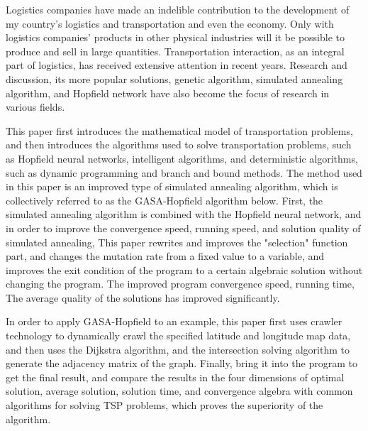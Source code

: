 \begin{eabstract}
    Logistics companies have made an indelible contribution to the development of my country’s logistics and transportation and even the economy. Only with logistics companies’ products in other physical industries will it be possible to produce and sell in large quantities. Transportation interaction, as an integral part of logistics, has received extensive attention in recent years. Research and discussion, its more popular solutions, genetic algorithm, simulated annealing algorithm, and Hopfield network have also become the focus of research in various fields.
    \par
    This paper first introduces the mathematical model of transportation problems, and then introduces the algorithms used to solve transportation problems, such as Hopfield neural networks, intelligent algorithms, and deterministic algorithms, such as dynamic programming and branch and bound methods. The method used in this paper is an improved type of simulated annealing algorithm, which is collectively referred to as the GASA-Hopfield algorithm below. First, the simulated annealing algorithm is combined with the Hopfield neural network, and in order to improve the convergence speed, running speed, and solution quality of simulated annealing, This paper rewrites and improves the "selection" function part, and changes the mutation rate from a fixed value to a variable, and improves the exit condition of the program to a certain algebraic solution without changing the program. The improved program convergence speed, running time, The average quality of the solutions has improved significantly.
    \par
    In order to apply GASA-Hopfield to an example, this paper first uses crawler technology to dynamically crawl the specified latitude and longitude map data, and then uses the Dijkstra algorithm, and the intersection solving algorithm to generate the adjacency matrix of the graph. Finally, bring it into the program to get the final result, and compare the results in the four dimensions of optimal solution, average solution, solution time, and convergence algebra with common algorithms for solving TSP problems, which proves the superiority of the algorithm. 
\end{eabstract}